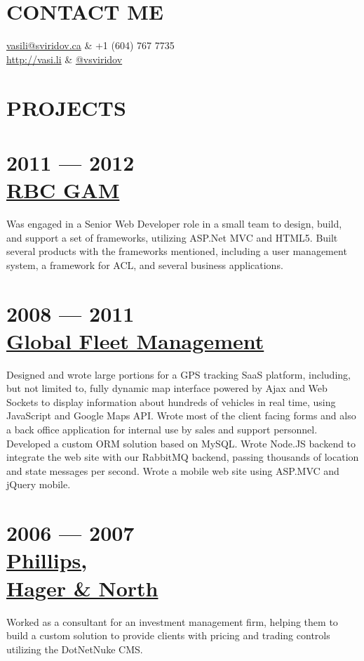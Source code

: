 \documentclass[margin]{res}
\begin{document}
  
\address{ \#304 - 6742 Station Hill Ct \\ Burnaby, BC, V3N4V2\\Canada }
\begin{resume}

\section{CONTACT ME}
	\begin{ncolumn}{2}
		\href{mailto:vasili@sviridov.ca}{vasili@sviridov.ca} & +1 (604) 767 7735 \\
		\href{http://vasi.li}{http://vasi.li} & \href{http://twitter.com/vsviridov}{@vsviridov}
	\end{ncolumn}
 
\section{PROJECTS}
	\section{2011 --- 2012\\\href{http://www.rbcgam.com/gam/}{RBC GAM}}
	Was engaged in a Senior Web Developer role in a small team to design, build, and support a set of frameworks, utilizing ASP.Net MVC and HTML5. Built several products with the frameworks mentioned, including a user management system, a framework for ACL, and several business applications.

	\section{2008 --- 2011\\\href{http://positrace.com}{Global Fleet Management}}
	 Designed and wrote large portions for a GPS tracking SaaS platform, including, but not limited to, fully dynamic map interface powered by Ajax and Web Sockets to display information about hundreds of vehicles in real time, using JavaScript and Google Maps API. Wrote most of the client facing forms and also a back office application for internal use by sales and support personnel. Developed a custom ORM solution based on MySQL. Wrote Node.JS backend to integrate the web site with our RabbitMQ backend, passing thousands of location and state messages per second. Wrote a mobile web site using ASP.MVC and jQuery mobile.

	\section{2006 --- 2007\\\href{https://wwwphn.com/}{Phillips,\\Hager \& North}}
	Worked as a consultant for an investment management firm, helping them to build a custom solution to provide clients with pricing and trading controls utilizing the DotNetNuke CMS.\\


\end{resume}
\end{document}
